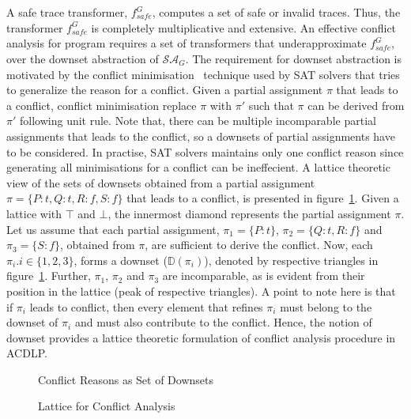 A safe trace transformer, $f_{safe}^{G}$, computes a set of safe or
invalid traces.  Thus, the transformer $f_{safe}^G$ is completely 
multiplicative and extensive.  An effective conflict analysis for program requires a set of 
transformers that underapproximate $f_{safe}^{G}$, over the 
downset abstraction of $\widehat{\mathcal{SA}_{G}}$.  The requirement 
for downset abstraction is motivated by the conflict 
minimisation~\cite{DBLP:conf/sat/SorenssonB09}
technique used by SAT solvers that tries to generalize the reason 
for a conflict. Given a partial assignment $\pi$ that leads to a conflict, 
conflict minimisation replace $\pi$ with $\pi'$ such that $\pi$ can be derived 
from $\pi'$ following unit rule.  Note that, there can be multiple incomparable 
partial assignments that leads to the conflict, so a downsets of partial 
assignments have to be considered.  In practise, SAT solvers maintains only 
one conflict reason since generating all minimisations for a conflict can be 
ineffecient.  A lattice theoretic view of the sets of downsets obtained from 
a partial assignment $\pi = \{P:t, Q:t, R:f, S:f\}$ that leads to a conflict, 
is presented in figure~\ref{downset-abs}.  Given a lattice with $\top$ and $\bot$, 
the innermost diamond represents the partial assignment $\pi$.  Let us assume 
that each partial assignment, $\pi_1 = \{P:t\}$, $\pi_2 = \{Q:t, R:f\}$ and  
$\pi_3 = \{S:f\}$, obtained from $\pi$, are sufficient to derive the conflict.  
Now, each $\pi_i. i \in \{1,2,3\}$, forms a downset ($\mathbb{D}(\pi_i)$), 
denoted by respective triangles in figure~\ref{downset-abs}.  Further, $\pi_1$, 
$\pi_2$ and $\pi_3$ are incomparable, as is evident from their position in the 
lattice (peak of respective triangles).  A point to note here is that if 
$\pi_i$ leads to conflict, then every element that refines $\pi_i$ must 
belong to the downset of $\pi_i$ and must also contribute to the conflict.  
Hence, the notion of downset provides a lattice theoretic formulation of 
conflict analysis procedure in ACDLP.
%
\begin{figure}
\centering
{}
  \caption{\label{downset-abs} Conflict Reasons as Set of Downsets}
\end{figure}  
%
%
\begin{figure}[htbp]
\centering
\vspace*{-0.2cm}
\caption{Lattice for Conflict Analysis \label{downset}}
\end{figure}
%


